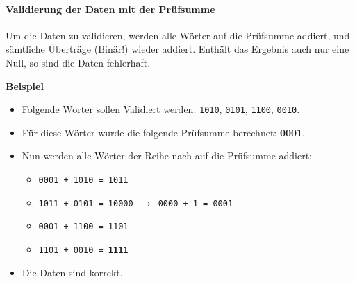 		\paragraph{Validierung der Daten mit der Prüfsumme}
			Um die Daten zu validieren, werden alle Wörter auf die Prüfsumme addiert, und sämtliche Überträge (Binär!) wieder addiert. Enthält das Ergebnis auch nur eine Null, so sind die Daten fehlerhaft.
			
			\textbf{Beispiel}
			\begin{itemize}
				\item Folgende Wörter sollen Validiert werden: \texttt{1010}, \texttt{0101}, \texttt{1100}, \texttt{0010}.
				\item Für diese Wörter wurde die folgende Prüfsumme berechnet: \textbf{0001}.
				\item Nun werden alle Wörter der Reihe nach auf die Prüfsumme addiert:
					\begin{itemize}
						\item \texttt{0001 + 1010 = 1011}
						\item \texttt{1011 + 0101 = 10000 \(\rightarrow\) 0000 + 1 = 0001}
						\item \texttt{0001 + 1100 = 1101}
						\item \texttt{1101 + 0010 = \textbf{1111}}
					\end{itemize}
				\item Die Daten sind korrekt.
			\end{itemize}

